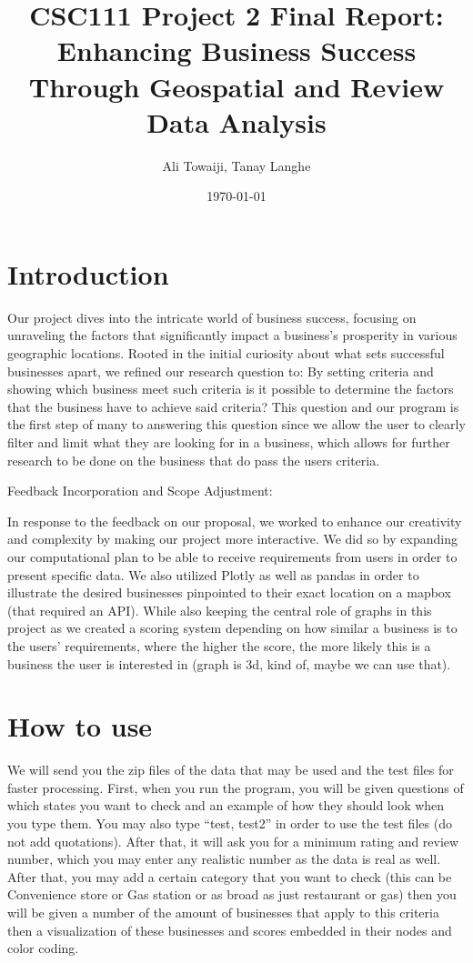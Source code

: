 \documentclass[fontsize=11pt]{article}
\title{CSC111 Project 2 Final Report: Enhancing Business Success Through Geospatial and Review Data Analysis}
\author{Ali Towaiji, Tanay Langhe}
\date{\today}
\begin{document}
\maketitle

\section*{Introduction}

Our project dives into the intricate world of business success, focusing on unraveling the factors that significantly impact a business's prosperity in various geographic locations. Rooted in the initial curiosity about what sets successful businesses apart, we refined our research question to: By setting criteria and showing which business meet such criteria is it possible to determine the factors that the business have to achieve said criteria? This question and our program is the first step of many to answering this question since we allow the user to clearly filter and limit what they are looking for in a business, which allows for further research to be done on the business that do pass the users criteria.

Feedback Incorporation and Scope Adjustment:

In response to the feedback on our proposal, we worked to enhance our creativity and complexity by making our project more interactive. We did so by expanding our computational plan to be able to receive requirements from users in order to present specific data. We also utilized Plotly as well as pandas in order to illustrate the desired businesses pinpointed to their exact location on a mapbox (that required an API). While also keeping the central role of graphs in this project as we created a scoring system depending on how similar a business is to the users' requirements, where the higher the score, the more likely this is a business the user is interested in (graph is 3d, kind of, maybe we can use that).

\section*{How to use}

We will send you the zip files of the data that may be used and the test files for faster processing. First, when you run the program, you will be given questions of which states you want to check and an example of how they should look when you type them. You may also type ``test, test2'' in order to use the test files (do not add quotations). After that, it will ask you for a minimum rating and review number, which you may enter any realistic number as the data is real as well. After that, you may add a certain category that you want to check (this can be Convenience store or Gas station or as broad as just restaurant or gas) then you will be given a number of the amount of businesses that apply to this criteria then a visualization of these businesses and scores embedded in their nodes and color coding.
\end{document}
